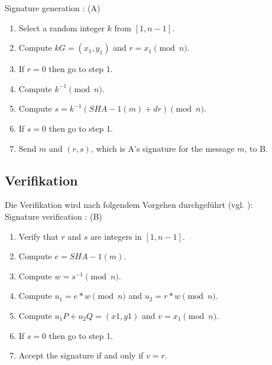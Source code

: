 Signature generation : (A)
\begin{enumerate}
\item Select a random integer $k$ from $[1, n - 1]$.
\item Compute $k G = (x_1, y_1)$ and $r = x_1 \pmod{n} $.
\item If $r = 0$ then go to step 1.
\item Compute $k^{-1} \pmod{n}$.
\item Compute $s = k^{-1}(SHA - 1(m) + dr)\pmod{n}$.
\item If $s = 0$ then go to step 1.
\item Send $m$ and $(r, s)$, which is A’s signature for the message $m$, to B.
\end{enumerate}

\subsection{Verifikation}

Die Verifikation wird nach folgendem Vorgehen durchgeführt (vgl. \cite{hwimp}):\\

Signature verification : (B)
\begin{enumerate}
\item Verify that $r$ and $s$ are integers in $[1, n - 1]$.
\item Compute $e = SHA - 1(m)$.
\item Compute $w = s^{-1}\pmod{n}$.
\item Compute $u_1 = e * w \pmod{n}$ and $u_2 = r * w \pmod{n}$.
\item Compute $u_1 P + u_2 Q = (x1, y1)$ and $v = x_1 \pmod{n}$.
\item If $s = 0$ then go to step 1.
\item Accept the signature if and only if $v = r$.
\end{enumerate}







